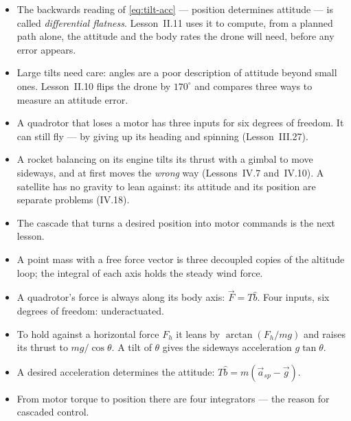 \begin{lookahead}
\begin{itemize}[leftmargin=1.2em]
  \item The backwards reading of \cref{eq:tilt-acc} — position determines attitude — is called \emph{differential flatness}. Lesson~II.11 uses it to compute, from a planned path alone, the attitude and the body rates the drone will need, before any error appears.
  \item Large tilts need care: angles are a poor description of attitude beyond small ones. Lesson~II.10 flips the drone by $170^\circ$ and compares three ways to measure an attitude error.
  \item A quadrotor that loses a motor has three inputs for six degrees of freedom. It can still fly — by giving up its heading and spinning (Lesson~III.27).
  \item A rocket balancing on its engine tilts its thrust with a gimbal to move sideways, and at first moves the \emph{wrong} way (Lessons~IV.7 and~IV.10). A satellite has no gravity to lean against: its attitude and its position are separate problems (IV.18).
  \item The cascade that turns a desired position into motor commands is the next lesson.
\end{itemize}
\end{lookahead}

\begin{remember}
\begin{itemize}
  \item A point mass with a free force vector is three decoupled copies of the altitude loop; the integral of each axis holds the steady wind force.
  \item A quadrotor's force is always along its body axis: $\vec F = T\hat b$. Four inputs, six degrees of freedom: underactuated.
  \item To hold against a horizontal force $F_h$ it leans by $\arctan(F_h/mg)$ and raises its thrust to $mg/\cos\theta$. A tilt of $\theta$ gives the sideways acceleration $g\tan\theta$.
  \item A desired acceleration determines the attitude: $T\hat b = m(\vec a_{sp} - \vec g)$.
  \item From motor torque to position there are four integrators — the reason for cascaded control.
\end{itemize}
\end{remember}

